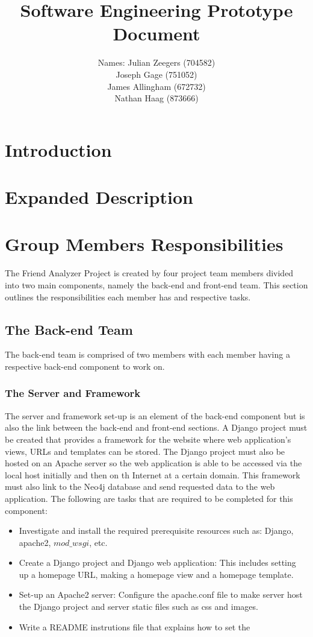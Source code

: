 \documentclass[10pt,onecolumn]{article}
\title{\vspace{-4.2cm}Software Engineering Prototype Document }
\author{ Names: Julian Zeegers (704582) \\  Joseph Gage (751052)\\James Allingham (672732) \\ Nathan Haag (873666) }
\begin{document}
\maketitle
\pagestyle{plain}
\setcounter{page}{1}


\section{Introduction}

\section{Expanded Description}

\section{Group Members Responsibilities}
The Friend Analyzer Project is created by four project team members divided into two main components, namely the back-end and front-end team. This section outlines the responsibilities each member has and respective tasks. 


\subsection{The Back-end Team}
The back-end team is comprised of two members with each member having a respective back-end component to work on.

\subsubsection{The Server and Framework}
The server and framework set-up is an element of the back-end component but is also the link between the back-end and front-end sections. A Django project must be created that provides a framework for the website where web application's views, URLs and templates can be stored. The Django project must also be hosted on an Apache server so the web application is able to be accessed via the local host initially and then on th Internet at a certain domain. This framework must also link to the Neo4j database and send requested data to the web application. The following are tasks that are required to be completed for this component:

\begin{itemize}
	\item Investigate and install the required prerequisite resources such as: Django, apache2, $mod\_wsgi$, etc.
	\item Create a Django project and Django web application: This includes setting up a homepage URL, making a homepage view and a homepage template.
	\item Set-up an Apache2 server: Configure the apache.conf file to make server host the Django project and server static files such as css and images.
	\item Write a README instrutions file that explains how to set the   
\end{itemize}
\end{document}

